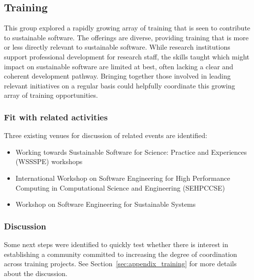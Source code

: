 \subsection{Training}


This group explored a rapidly growing array of training that is seen to
contribute to sustainable software. The offerings are diverse, providing
training that is more or less directly relevant to sustainable software. While
research institutions support professional development for research staff, the
skills taught which might impact on sustainable software are limited at best,
often lacking a clear and coherent development pathway. Bringing together those
involved in leading relevant initiatives on a regular basis could helpfully
coordinate this growing array of training opportunities.

\subsubsection{Fit with related activities} 

Three existing venues for discussion of related events are
identified:
%
\begin{itemize}

\item Working towards Sustainable Software for Science: Practice and
Experiences (WSSSPE) workshops~\cite{WSSSPE}

\item International Workshop on Software Engineering for High
Performance Computing in Computational Science and
Engineering (SEHPCCSE)~\cite{SEHPCCSE}

\item Workshop on Software Engineering for Sustainable Systems~\cite{se4susy}

\end{itemize}

\subsubsection{Discussion}

Some next steps were identified to quickly test whether there is interest in
establishing a community committed to increasing the degree of coordination
across training projects. See Section~\ref{sec:appendix_training} for more
details about the discussion.

